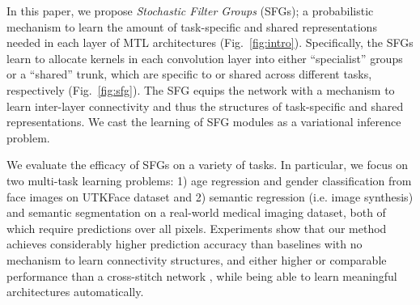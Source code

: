 
In this paper, we propose \textit{Stochastic Filter Groups} (SFGs); a probabilistic mechanism to learn the amount of task-specific and shared representations needed in each layer of MTL architectures (Fig.~\ref{fig:intro}). Specifically, the SFGs learn to allocate kernels in each convolution layer into either ``specialist'' groups or a ``shared'' trunk, which are specific to or shared across different tasks, respectively (Fig.~\ref{fig:sfg}). The SFG equips the network with a mechanism to learn inter-layer connectivity and thus the structures of task-specific and shared representations. We cast the learning of SFG modules as a variational inference problem.

We evaluate the efficacy of SFGs on a variety of tasks. In particular, we focus on two multi-task learning problems: 1) age regression and gender classification from face images on UTKFace dataset \cite{zhifei2017cvpr} and 2) semantic regression (i.e. image synthesis) and semantic segmentation on a real-world medical imaging dataset, both of which require predictions over all pixels. Experiments show that our method achieves considerably higher prediction accuracy than baselines with no mechanism to learn connectivity structures, and either higher or comparable performance than a cross-stitch network \cite{MisraCrossMTL16}, while being able to learn meaningful architectures automatically.






